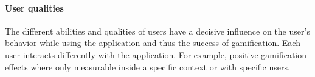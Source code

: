 \paragraph*{User qualities}

The different abilities and qualities of users have a decisive influence on the user's behavior while using the application and thus the success of gamification. Each user interacts differently with the application. For example, positive gamification effects where only measurable inside a specific context or with specific users. \cite[p. 3029, 3030]{hamariDoesGamificationWork2014}


\newpage
